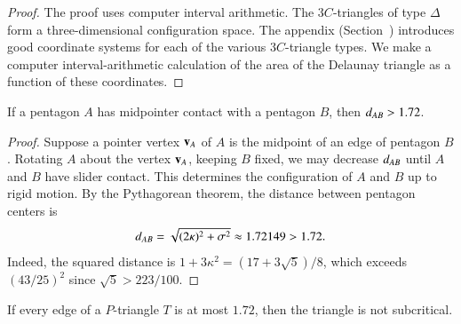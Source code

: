 \begin{proof} The proof uses computer interval arithmetic. The $3C$-triangles of
  type $\Delta$ form a three-dimensional configuration space.  The
  appendix (Section~) introduces good coordinate
  systems for each of the various $3C$-triangle types.  We make a
  computer interval-arithmetic calculation of the area of the Delaunay triangle as a
  function of these coordinates.
\end{proof}

\begin{lemma}  
  If a pentagon $A$ has midpointer contact with a pentagon $B$, then
  $d_{AB} > 1.72$.
\end{lemma}

\begin{proof} Suppose a pointer vertex ${\mathbf v}_A$ of $A$ is the midpoint of an
  edge of pentagon $B$.  Rotating $A$ about the vertex ${\mathbf v}_A$, keeping
  $B$ fixed, we may decrease $d_{AB}$ until $A$ and $B$
  have slider contact.  This determines the configuration of $A$ and
  $B$ up to rigid motion.  By the Pythagorean theorem, the
  distance between pentagon centers is
\[
d_{AB} = \sqrt{(2\kappa)^2 + \sigma^2} \approx 1.72149 > 1.72.
\] %
Indeed, the squared distance is $1+3\kappa^2=(17+3\sqrt5)/8$,
which exceeds $(43/25)^2$ since $\sqrt5>223/100$.
\end{proof}

\begin{lemma}
  If every edge of a $P$-triangle $T$ is at most $1.72$, then the
  triangle is not subcritical.
\end{lemma}

